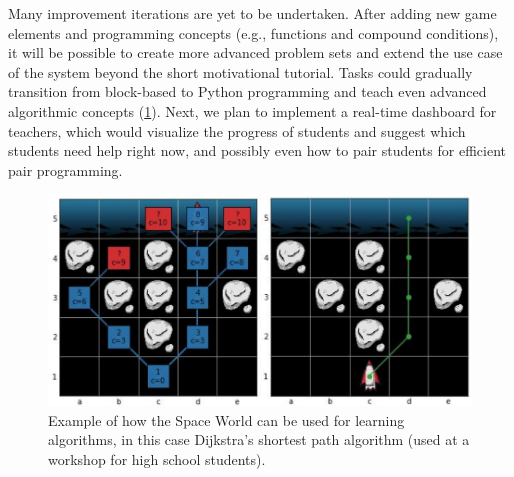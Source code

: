 Many improvement iterations are yet to be undertaken. After adding
new game elements and programming concepts (e.g., functions and compound
conditions), it will be possible to create more advanced problem sets
and extend the use case of the system beyond the short motivational tutorial.
Tasks could gradually transition from block-based to Python programming
and teach even advanced algorithmic concepts (\cref{fig:robomission-search-tree}).
Next, we plan to implement a real-time dashboard for teachers,
which would visualize the progress %
of students and suggest
which students need help right now, and possibly even how to pair students
for efficient pair programming.


\begin{figure}[htb]
\centering
\includegraphics[width=\textwidth]{img/robomission-search-tree}
\caption{%
  Example of how the Space World can be used for learning algorithms,
  in this case Dijkstra's shortest path algorithm
  (used at a workshop for high school students).}
\label{fig:robomission-search-tree}
\end{figure}


